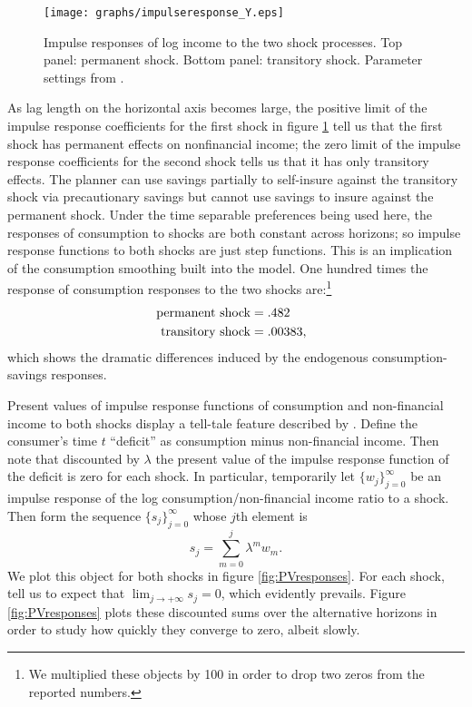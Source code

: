 \documentclass[12pt]{article}
\begin{document}
\begin{figure}[H]
\texttt{[image: graphs/impulseresponse\_Y.eps]}
\caption{Impulse responses of log income to the two shock processes. Top panel: permanent shock.  Bottom panel: transitory shock.  Parameter settings from \cite{hst:1999}. }\label{fig:incomeresponse}
\end{figure}

As lag length on the horizontal axis becomes large, the positive limit of the impulse response coefficients for the first shock  in figure \ref{fig:incomeresponse}  tell us that
the first shock has permanent effects on nonfinancial income;  the zero limit of the impulse response coefficients for the second shock tells us that it has only transitory effects.
 The planner  can use savings partially to self-insure against  the transitory shock via  precautionary savings but  cannot use savings to insure against the permanent  shock.   Under the time separable preferences being used here, the responses of consumption to  shocks are both constant across horizons; so impulse response functions
to both shocks are just step functions.  This is an implication of the  consumption smoothing built into the model.  One hundred times the response of  consumption responses  to the two shocks  are:\footnote{We multiplied these objects by 100 in order to drop two zeros from the reported numbers.}
\begin{align*}
\textrm{ permanent shock} &= .482 \cr
\textrm{ transitory shock} & = .00383,
\end{align*}
 which shows the dramatic differences induced by the endogenous consumption-savings responses.

Present values of  impulse response functions of consumption and non-financial income to both shocks  display a tell-tale feature described by  \cite{hsroberds}.   Define the consumer's time $t$ ``deficit''  as consumption minus non-financial income. Then 
 \citeauthor{hsroberds} note that discounted by $\lambda$ the present value of the impulse response function of the deficit is zero for each shock.
In particular, temporarily let $\{w_j\}_{j=0}^\infty$ be an impulse response of the log consumption/non-financial income ratio to a shock.
  Then form the sequence $\{s_j\}_{j=0}^\infty$ whose $j$th element is
\[ s_j = \sum_{m=0}^j \lambda^m w_m  .\]
   We plot this object for both shocks in figure  \ref{fig:PVresponses}.
   For each shock, \citeauthor{hsroberds} tell us to  expect that $\lim_{j\rightarrow +\infty} s_j = 0 $, which evidently prevails.
    Figure \ref{fig:PVresponses} plots these discounted sums over the alternative horizons in order to study how quickly they converge to zero,
    albeit slowly.
\end{document}
